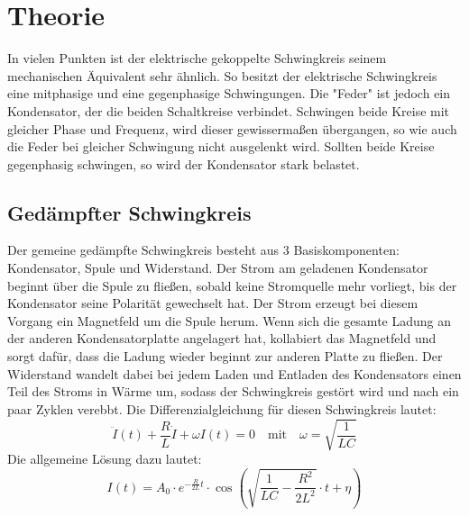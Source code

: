 \section{Theorie}
\label{sec:Theorie}

In vielen Punkten ist der elektrische gekoppelte Schwingkreis seinem mechanischen Äquivalent sehr ähnlich.
So besitzt der elektrische Schwingkreis eine mitphasige und eine gegenphasige Schwingungen. 
Die "Feder" ist jedoch ein Kondensator, der die beiden Schaltkreise verbindet.
Schwingen beide Kreise mit gleicher Phase und Frequenz, wird dieser gewissermaßen übergangen, so wie auch die Feder bei gleicher Schwingung nicht ausgelenkt wird.
Sollten beide Kreise gegenphasig schwingen, so wird der Kondensator stark belastet.
\subsection{Gedämpfter Schwingkreis}
Der gemeine gedämpfte Schwingkreis besteht aus 3 Basiskomponenten: Kondensator, Spule und Widerstand.
Der Strom am geladenen Kondensator beginnt über die Spule zu fließen, sobald keine Stromquelle mehr vorliegt, bis der Kondensator seine Polarität gewechselt hat.
Der Strom erzeugt bei diesem Vorgang ein Magnetfeld um die Spule herum. 
Wenn sich die gesamte Ladung an der anderen Kondensatorplatte angelagert hat, kollabiert das Magnetfeld und sorgt dafür, dass die Ladung wieder beginnt zur anderen Platte zu fließen.
Der Widerstand wandelt dabei bei jedem Laden und Entladen des Kondensators einen Teil des Stroms in Wärme um, sodass der Schwingkreis gestört wird und nach ein paar Zyklen verebbt.
Die Differenzialgleichung für diesen Schwingkreis lautet:
\begin{equation}
    \ddot{I}(t) + \frac{R}{L}\dot{I} + \omega I(t) = 0 \quad\textrm{mit}\quad \omega = \sqrt{\frac{1}{LC}}
    \label{eq:harmossi}
\end{equation}
Die allgemeine Lösung dazu lautet:
\begin{equation}
    I(t) = A_0 \cdot e^{-\frac{R}{2L}t} \cdot \cos{(\sqrt{\frac{1}{LC}-\frac{R^2}{2L^2}}\cdot t+\eta)}
\end{equation}